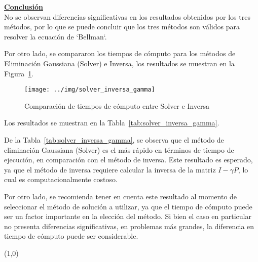 \indent\underline{\textbf{Conclusión}}\\
No se observan diferencias significativas en los resultados obtenidos por los tres métodos, por lo que se puede concluir que los tres métodos son válidos para resolver la ecuación de `Bellman`.

Por otro lado, se compararon los tiempos de cómputo para los métodos de Eliminación Gaussiana (Solver) e Inversa, los resultados se muestran en la Figura~\ref{fig:time_comparison}.

\begin{figure}[H]
    \centering
    \texttt{[image: ../img/solver\_inversa\_gamma]}
    \caption{Comparación de tiempos de cómputo entre Solver e Inversa}
    \label{fig:time_comparison}
\end{figure}

Los resultados se muestran en la Tabla~\ref{tab:solver_inversa_gamma}.



De la Tabla~\ref{tab:solver_inversa_gamma}, se observa que el método de eliminación Gaussiana (Solver) es el más rápido en términos de tiempo de ejecución, en comparación con el método de inversa.
Este resultado es esperado, ya que el método de inversa requiere calcular la inversa de la matriz $I - \gamma P$, lo cual es computacionalmente costoso.

Por otro lado, se recomienda tener en cuenta este resultado al momento de seleccionar el método de solución a utilizar, ya que el tiempo de cómputo puede ser un factor importante en la elección del método.
Si bien el caso en particular no presenta diferencias significativas, en problemas más grandes, la diferencia en tiempo de cómputo puede ser considerable.

\line(1,0){\textwidth}
